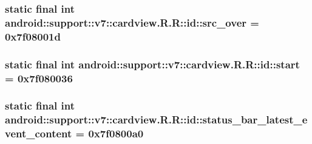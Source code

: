 \hypertarget{classandroid_1_1support_1_1v7_1_1cardview_1_1_r_1_1id_417b9cf6ccd42d9c2d5bd682a8bc42b0}{
\subsubsection[{src\_\-over}]{\setlength{\rightskip}{0pt plus 5cm}static final int android::support::v7::cardview.R.R::id::src\_\-over = 0x7f08001d}}
\label{classandroid_1_1support_1_1v7_1_1cardview_1_1_r_1_1id_417b9cf6ccd42d9c2d5bd682a8bc42b0}


\hypertarget{classandroid_1_1support_1_1v7_1_1cardview_1_1_r_1_1id_52f43d1506c3fafcf0204817c89baad3}{
\subsubsection[{start}]{\setlength{\rightskip}{0pt plus 5cm}static final int android::support::v7::cardview.R.R::id::start = 0x7f080036}}
\label{classandroid_1_1support_1_1v7_1_1cardview_1_1_r_1_1id_52f43d1506c3fafcf0204817c89baad3}


\hypertarget{classandroid_1_1support_1_1v7_1_1cardview_1_1_r_1_1id_a7ada7ed28555edff11799b4ae308153}{
\subsubsection[{status\_\-bar\_\-latest\_\-event\_\-content}]{\setlength{\rightskip}{0pt plus 5cm}static final int android::support::v7::cardview.R.R::id::status\_\-bar\_\-latest\_\-event\_\-content = 0x7f0800a0}}
\label{classandroid_1_1support_1_1v7_1_1cardview_1_1_r_1_1id_a7ada7ed28555edff11799b4ae308153}



